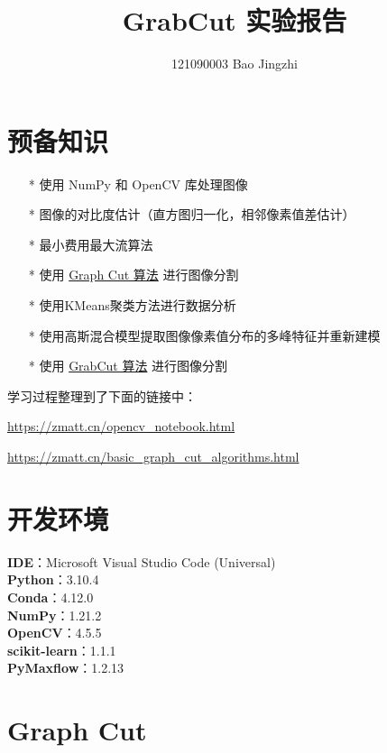 \documentclass[lang=cn,11pt,a4paper]{elegantpaper}
\title{GrabCut 实验报告}
\author{121090003    Bao Jingzhi}
\institute{CUHK(SZ)}
\date{\zhtoday}
\begin{document}
\maketitle

\section{预备知识}
\begin{itemize}
    \item[*] 使用 NumPy 和 OpenCV 库处理图像
	\item[*] 图像的对比度估计（直方图归一化，相邻像素值差估计）
    \item[*] 最小费用最大流算法
    \item[*] 使用 \href{https://www.csd.uwo.ca/~yboykov/Papers/iccv01.pdf}{Graph Cut 算法} 进行图像分割
    \item[*] 使用KMeans聚类方法进行数据分析
    \item[*] 使用高斯混合模型提取图像像素值分布的多峰特征并重新建模
	\item[*] 使用 \href{https://cvg.ethz.ch/teaching/cvl/2012/grabcut-siggraph04.pdf}{GrabCut 算法} 进行图像分割
\end{itemize} 

\vspace{10pt}

学习过程整理到了下面的链接中：

\url{https://zmatt.cn/opencv_notebook.html}

\url{https://zmatt.cn/basic_graph_cut_algorithms.html}

\section{开发环境}

\noindent
\textbf{IDE}：Microsoft Visual Studio Code (Universal)\\
\textbf{Python}：3.10.4\\
\textbf{Conda}：4.12.0\\
\textbf{NumPy}：1.21.2\\
\textbf{OpenCV}：4.5.5\\
\textbf{scikit-learn}：1.1.1\\
\textbf{PyMaxflow}：1.2.13

\newpage

\section{Graph Cut}
\end{document}

